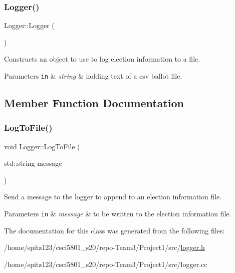 \subsubsection{\texorpdfstring{Logger()}{Logger()}}
{\footnotesize\ttfamily Logger\+::\+Logger (\begin{DoxyParamCaption}{ }\end{DoxyParamCaption})}



Constructs an object to use to log election information to a file. 


\begin{DoxyParams}[1]{Parameters}
\mbox{\tt in}  & {\em string} & holding text of a csv ballot file. \\
\hline
\end{DoxyParams}


\subsection{Member Function Documentation}
\mbox{\label{classLogger_adb535266f5ad2a27ce2bd589884f347b}} 
\subsubsection{\texorpdfstring{Log\+To\+File()}{LogToFile()}}
{\footnotesize\ttfamily void Logger\+::\+Log\+To\+File (\begin{DoxyParamCaption}\item[{std\+::string}]{message }\end{DoxyParamCaption})}



Send a message to the logger to append to an election information file. 


\begin{DoxyParams}[1]{Parameters}
\mbox{\tt in}  & {\em message} & to be written to the election information file. \\
\hline
\end{DoxyParams}


The documentation for this class was generated from the following files\+:\begin{DoxyCompactItemize}
\item 
/home/spitz123/csci5801\+\_\+s20/repo-\/\+Team3/\+Project1/src/\hyperlink{logger_8h}{logger.\+h}\item 
/home/spitz123/csci5801\+\_\+s20/repo-\/\+Team3/\+Project1/src/logger.\+cc\end{DoxyCompactItemize}
